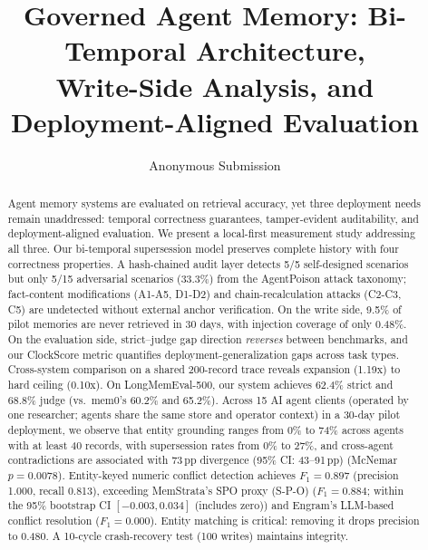\documentclass{llncs}
\begin{document}
\title{Governed Agent Memory: Bi-Temporal Architecture,\\Write-Side Analysis, and Deployment-Aligned Evaluation}

\author{Anonymous Submission}
\maketitle

\begin{abstract}
Agent memory systems are evaluated on retrieval accuracy, yet three deployment needs remain unaddressed: temporal correctness guarantees, tamper-evident auditability, and deployment-aligned evaluation. We present a local-first measurement study addressing all three. Our bi-temporal supersession model preserves complete history with four correctness properties. A hash-chained audit layer detects 5/5 self-designed scenarios but only 5/15 adversarial scenarios (33.3\%) from the AgentPoison attack taxonomy; fact-content modifications (A1-A5, D1-D2) and chain-recalculation attacks (C2-C3, C5) are undetected without external anchor verification. On the write side, 9.5\% of pilot memories are never retrieved in 30 days, with injection coverage of only 0.48\%. On the evaluation side, strict--judge gap direction \emph{reverses} between benchmarks, and our ClockScore metric quantifies deployment-generalization gaps across task types. Cross-system comparison on a shared 200-record trace reveals expansion (1.19x) to hard ceiling (0.10x). On LongMemEval-500, our system achieves 62.4\% strict and 68.8\% judge (vs.\ mem0's 60.2\% and 65.2\%). Across 15 AI agent clients (operated by one researcher; agents share the same store and operator context) in a 30-day pilot deployment, we observe that entity grounding ranges from 0\% to 74\% across agents with at least 40 records, with supersession rates from 0\% to 27\%, and cross-agent contradictions are associated with 73\,pp divergence (95\% CI: 43--91\,pp) (McNemar $p{=}0.0078$). Entity-keyed numeric conflict detection achieves $F_1{=}0.897$ (precision 1.000, recall 0.813), exceeding MemStrata's SPO proxy (S-P-O) ($F_1{=}0.884$; within the 95\% bootstrap CI $[-0.003, 0.034]$ (includes zero)) and Engram's LLM-based conflict resolution ($F_1{=}0.000$). Entity matching is critical: removing it drops precision to 0.480. A 10-cycle crash-recovery test (100 writes) maintains integrity.
\end{abstract}
\end{document}
